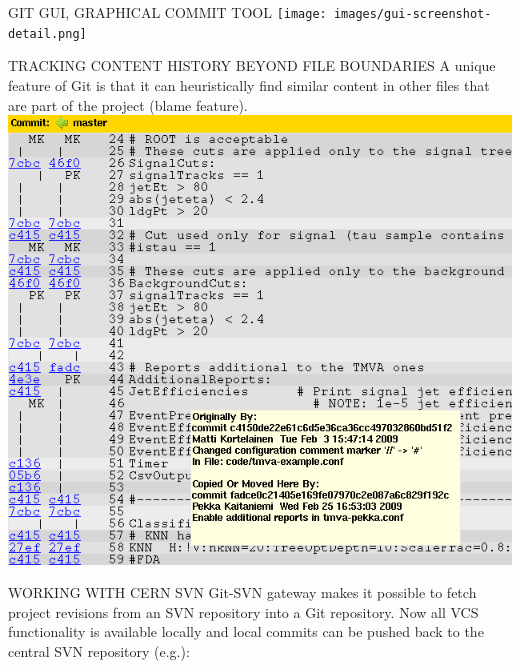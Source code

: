 \documentclass[final,hyperref={pdfpagelabels=false},notitlepage=true]{beamer}
\begin{document}
\begin{frame}{}
\begin{columns}[t]
\begin{column}{0.45\linewidth}
    \vskip2cm
    \begin{block}{\large GIT GUI, GRAPHICAL COMMIT TOOL}
    \vskip1cm
      \texttt{[image: images/gui-screenshot-detail.png]}
    \end{block}

    \vskip2cm
    \begin{block}{\large TRACKING CONTENT HISTORY BEYOND FILE BOUNDARIES}
    \vskip1cm
      A unique
      feature of Git is that it can heuristically find similar
      content in other files that are part of the project (blame feature).
      \vskip1cm
      \includegraphics[width=1.0\linewidth]{images/git-gui-blame-content-copy-detection-detail.png}
    \end{block}

    \vskip2cm
	\begin{block}{\large WORKING WITH CERN SVN}
          \vskip1cm
          Git-SVN gateway makes it possible to fetch project revisions from an SVN repository into a Git 
          repository.
          \vskip1cm
          {\color{orange} Now all VCS functionality is available locally} and local commits can be pushed back to the central SVN repository (e.g.):


\end{block}
\end{column}
\end{columns}
\end{frame}
\end{document}
